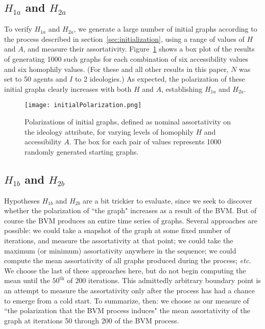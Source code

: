 
\subsection{$H_{1a}$ and $H_{2a}$}

To verify $H_{1a}$ and $H_{2a}$, we generate a large number of initial graphs
according to the process described in section~\ref{sec:initialization}, using
a range of values of $H$ and $A$, and measure their assortativity.
Figure~\ref{fig:initialPolarization} shows a box plot of the results of
generating 1000 such graphs for each combination of six accessibility values
and six homophily values. (For these and all other results in this paper, $N$
was set to 50 agents and $I$ to 2 ideologies.) As expected, the polarization
of these initial graphs clearly increases with both $H$ and $A$, establishing
$H_{1a}$ and $H_{2a}$.

\begin{figure}
\centering
\texttt{[image: initialPolarization.png]}
\caption{Polarizations of initial graphs, defined as nominal assortativity on
the ideology attribute, for varying levels of homophily $H$ and accessibility
$A$. The box for each pair of values represents 1000 randomly generated
starting graphs.}
\label{fig:initialPolarization}
\end{figure}

\subsection{$H_{1b}$ and $H_{2b}$}

Hypotheses $H_{1b}$ and $H_{2b}$ are a bit trickier to evaluate, since we seek
to discover whether the polarization of ``the graph" increases as a result
of the BVM. But of course the BVM produces an entire time series of graphs.
Several approaches are possible: we could take a snapshot of the graph at some
fixed number of iterations, and measure the assortativity at that point; we
could take the maximum (or minimum) assortativity anywhere in the sequence; we
could compute the mean assortativity of all graphs produced during the
process; \textit{etc.} We choose the last of these approaches here, but do not
begin computing the mean until the $50^{\text{th}}$ of 200 iterations. This
admittedly arbitrary boundary point is an attempt to measure the assortativity
only after the process has had a chance to emerge from a cold start. To
summarize, then: we choose as our measure of ``the polarization that the BVM
process induces" the mean assortativity of the graph at iterations 50 through
200 of the BVM process.

